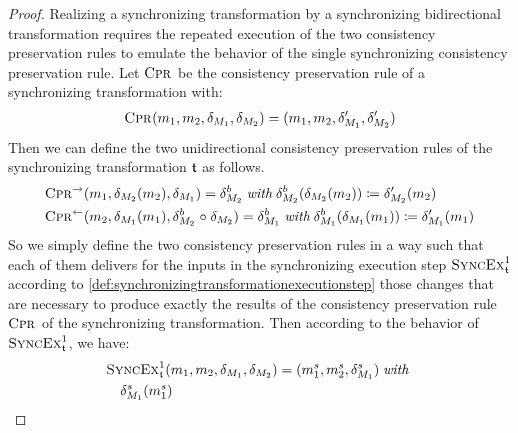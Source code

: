 \begin{proof}
    Realizing a synchronizing transformation by a synchronizing bidirectional transformation requires the repeated execution of the two consistency preservation rules to emulate the behavior of the single 
    synchronizing consistency preservation rule.
    Let $\textsc{Cpr}_{}$ be the consistency preservation rule of a synchronizing transformation with:
    \begin{align*}
        \consistencypreservationrule{}(\model{m}{1},\model{m}{2},\change{\metamodel{M}{1}},\change{\metamodel{M}{2}}) = (\model{m}{1},\model{m}{2},\change{\metamodel{M}{1}}',\change{\metamodel{M}{2}}')
    \end{align*}
    Then we can define the two unidirectional consistency preservation rules of the synchronizing transformation $\transformation{t}$ as follows.
    \begin{align*}
        & 
        \consistencypreservationrule{}^{\rightarrow}(\model{m}{1},\change{\metamodel{M}{2}}(\model{m}{2}),\change{\metamodel{M}{1}}) = \change{\metamodel{M}{2}}^{b} \withmath \change{\metamodel{M}{2}}^{b}(\change{\metamodel{M}{2}}(\model{m}{2})) \equalsperdefinition \change{\metamodel{M}{2}}'(\model{m}{2}) \\
        &
        \consistencypreservationrule{}^{\leftarrow}(\model{m}{2},\change{\metamodel{M}{1}}(\model{m}{1}),\change{\metamodel{M}{2}}^{b} \concatfunction \change{\metamodel{M}{2}}) = \change{\metamodel{M}{1}}^{b} \withmath \change{\metamodel{M}{1}}^{b}(\change{\metamodel{M}{1}}(\model{m}{1})) \equalsperdefinition \change{\metamodel{M}{1}}'(\model{m}{1})
    \end{align*}
    So we simply define the two consistency preservation rules in a way such that each of them delivers for the inputs in the synchronizing execution step $\function{SyncEx}_{\transformation{t}}^1$ according to \autoref{def:synchronizingtransformationexecutionstep} those changes that are necessary to produce exactly the results of the consistency preservation rule $\textsc{Cpr}_{}$ of the synchronizing transformation.
    Then according to the behavior of $\function{SyncEx}_{\transformation{t}}^1$, we have:
    \begin{align*}
        &
        \function{SyncEx}_{\transformation{t}}^1(\model{m}{1},\model{m}{2},\change{\metamodel{M}{1}},\change{\metamodel{M}{2}}) = (\model{m}{1}^{s}, \model{m}{2}^{s}, \change{\metamodel{M}{1}}^{s}) \withmath \\
        & \formulaskip
        \change{\metamodel{M}{1}}^{s}(\model{m}{1}^{s}) %

\end{align*}
\end{proof}

